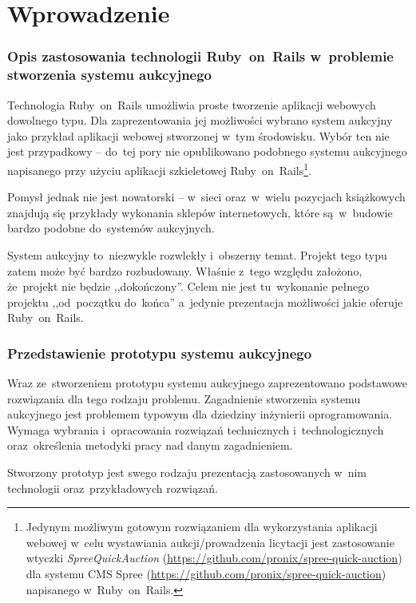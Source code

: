 \section{Wprowadzenie}

\subsubsection{Opis zastosowania technologii Ruby~on~Rails w~problemie stworzenia systemu aukcyjnego}

Technologia Ruby~on~Rails umożliwia proste tworzenie aplikacji webowych dowolnego typu. Dla zaprezentowania jej możliwości wybrano system aukcyjny jako przykład aplikacji webowej stworzonej w~tym środowisku. Wybór ten nie jest przypadkowy -- do~tej pory nie opublikowano podobnego systemu aukcyjnego napisanego przy użyciu aplikacji szkieletowej Ruby~on~Rails\footnote{Jedynym możliwym gotowym rozwiązaniem dla wykorzystania aplikacji webowej w~celu wystawiania aukcji/prowadzenia licytacji jest zastosowanie wtyczki \textit{SpreeQuickAuction} (\url{https://github.com/pronix/spree-quick-auction}) dla systemu CMS Spree (\url{https://github.com/pronix/spree-quick-auction}) napisanego w~Ruby~on~Rails.}.


Pomysł jednak nie jest nowatorski -- w~sieci oraz~w~wielu pozycjach książkowych znajdują się przykłady wykonania sklepów internetowych, które są~w~budowie bardzo podobne do~systemów aukcyjnych.


System aukcyjny to~niezwykle rozwlekły i~obszerny temat. Projekt tego typu zatem może być bardzo rozbudowany. Właśnie z~tego względu założono, że~projekt nie będzie ,,dokończony''. Celem nie jest tu~wykonanie pełnego projektu ,,od~początku do~końca'' a~jedynie prezentacja możliwości jakie oferuje Ruby~on~Rails.

\subsubsection{Przedstawienie prototypu systemu aukcyjnego}

Wraz ze~stworzeniem prototypu systemu aukcyjnego zaprezentowano podstawowe rozwią\-zania dla tego rodzaju problemu. Zagadnienie stworzenia systemu aukcyjnego jest problemem typowym dla dziedziny inżynierii oprogramowania. Wymaga wybrania i~opracowania rozwiązań technicznych i~technologicznych oraz~określenia metodyki pracy nad danym zagadnieniem.


Stworzony prototyp jest swego rodzaju prezentacją zastosowanych w~nim technologii oraz~przykładowych rozwiązań.
